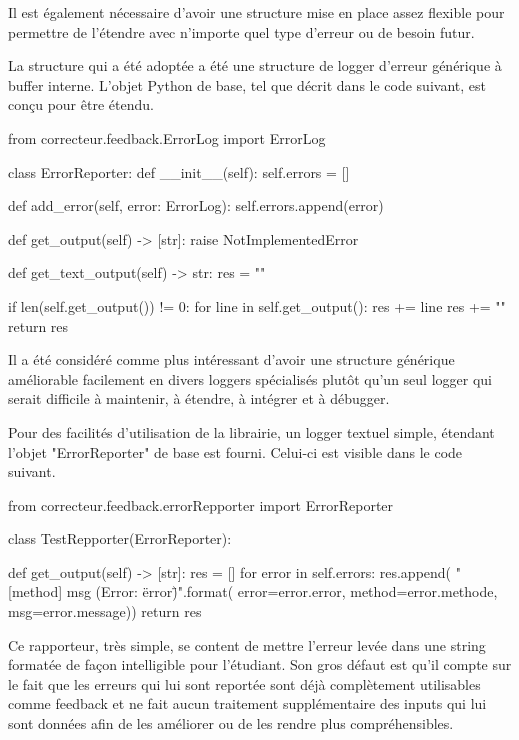 \documentclass[a4paper]{report}
\begin{document}
Il est également nécessaire d'avoir une structure mise en place assez flexible pour permettre de l'étendre avec n'importe quel type d'erreur ou de besoin futur.

La structure qui a été adoptée a été une structure de logger d'erreur générique à buffer interne.
L'objet Python de base, tel que décrit dans le code suivant, est conçu pour être étendu.


\begin{python}
from correcteur.feedback.ErrorLog import ErrorLog

class ErrorReporter:
    def __init__(self):
        self.errors = []

    def add_error(self, error: ErrorLog):
        self.errors.append(error)

    def get_output(self) -> [str]:
        raise NotImplementedError

    def get_text_output(self) -> str:
        res = ""

        if len(self.get_output()) != 0:
            for line in self.get_output():
                res += line
                res += "\n"
        return res
\end{python}



Il a été considéré comme plus intéressant d'avoir une structure générique améliorable facilement en divers loggers spécialisés plutôt qu'un seul logger qui serait difficile à maintenir, à étendre, à intégrer et à débugger.


Pour des facilités d'utilisation de la librairie, un logger textuel simple, étendant l'objet "ErrorReporter" de base est fourni.
Celui-ci est visible dans le code suivant.


\begin{python}
from correcteur.feedback.errorRepporter import ErrorReporter


class TestRepporter(ErrorReporter):

    def get_output(self) -> [str]:
        res = []
        for error in self.errors:
            res.append(
                "[{method}] {msg} (Error: \"{error}\")".format(
                    error=error.error,
                    method=error.methode,
                    msg=error.message))
        return res
\end{python}

Ce rapporteur, très simple, se content de mettre l'erreur levée dans une string formatée de façon intelligible pour l'étudiant.
Son gros défaut est qu'il compte sur le fait que les erreurs qui lui sont reportée sont déjà complètement utilisables comme feedback et ne fait aucun traitement supplémentaire des inputs qui lui sont données afin de les améliorer ou de les rendre plus compréhensibles.
\end{document}
